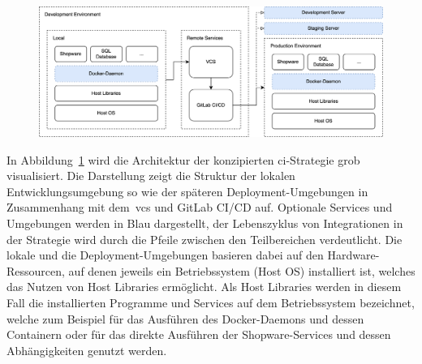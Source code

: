 \begin{figure}[H]
    \centering
    \includegraphics[width=\textwidth]{images/content/ci-architecture-concept}
    \label{fig:ci-architecture-concept}
\end{figure}

In Abbildung\ \ref{fig:ci-architecture-concept} wird die Architektur der konzipierten \acrshort{ci}-Strategie grob
visualisiert.
Die Darstellung zeigt die Struktur der lokalen Entwicklungsumgebung so wie der späteren Deployment-Umgebungen in
Zusammenhang mit dem\ \acrshort{vcs} und GitLab CI/CD auf.
Optionale Services und Umgebungen werden in Blau dargestellt, der Lebenszyklus von Integrationen in der Strategie wird
durch die Pfeile zwischen den Teilbereichen verdeutlicht.
Die lokale und die Deployment-Umgebungen basieren dabei auf den Hardware-Ressourcen, auf denen jeweils ein
Betriebssystem (Host OS) installiert ist, welches das Nutzen von Host Libraries ermöglicht.
Als Host Libraries werden in diesem Fall die installierten Programme und Services auf dem Betriebssystem bezeichnet,
welche zum Beispiel für das Ausführen des Docker-Daemons und dessen Containern oder für das direkte Ausführen der
Shopware-Services und dessen Abhängigkeiten genutzt werden.

\clearpage
